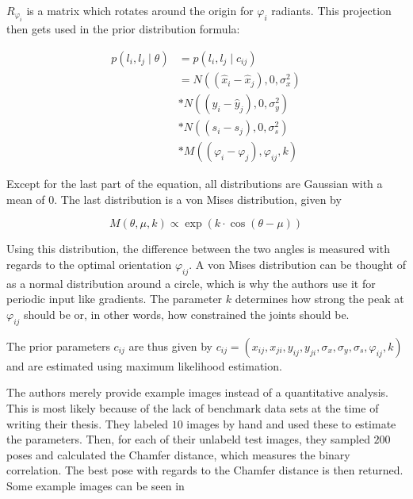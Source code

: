 $R_{\varphi_i}$ is a matrix which rotates around the origin for $\varphi_i$ radiants.
This projection then gets used in the prior distribution formula:

\begin{equation}
    \begin{split}
        p(l_i, l_j \mid \theta) 
        &= p(l_i, l_j \mid c_{ij}) \\
        &= N((\hat{x}_i - \hat{x}_j), 0, \sigma_x^2) \\
        &* N((\hat{y}_i - \hat{y}_j), 0, \sigma_y^2) \\
        &* N((s_i - s_j), 0, \sigma_s^2) \\
        &* M((\varphi_i - \varphi_j), \varphi_{ij}, k)
    \end{split}    
\end{equation}

Except for the last part of the equation, all distributions are Gaussian with a mean of $0$.
The last distribution is a von Mises distribution, given by

\begin{equation}
    M(\theta, \mu, k) \propto \exp (k \cdot \cos (\theta - \mu))
\end{equation}

Using this distribution, the difference between the two angles is measured with regards to the optimal orientation $\varphi_{ij}$.
A von Mises distribution can be thought of as a normal distribution around a circle, which is why the authors use it for periodic input like gradients.
The parameter $k$ determines how strong the peak at $\varphi_{ij}$ should be or, in other words, how constrained the joints should be. 

The prior parameters $c_{ij}$ are thus given by $c_{ij} = (x_{ij}, x_{ji}, y_{ij}, y_{ji}, \sigma_x, \sigma_y, \sigma_s, \varphi_{ij}, k)$ and are estimated using maximum likelihood estimation.

The authors merely provide example images instead of a quantitative analysis.
This is most likely because of the lack of benchmark data sets at the time of writing their thesis.
They labeled $10$ images by hand and used these to estimate the parameters.
Then, for each of their unlabeld test images, they sampled $200$ poses and calculated the Chamfer distance, which measures the binary correlation.
The best pose with regards to the Chamfer distance is then returned.
Some example images can be seen in 

